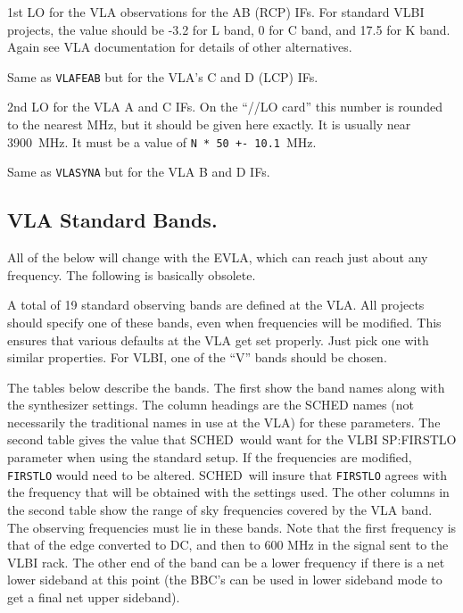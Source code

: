 \documentclass{report}
\newcommand{\schedb}{{\sc SCHED~}}
\begin{document}
\begin{list}{}{\parsep 0em  \itemsep 0em }
\item {} 1st LO for the VLA observations
for the AB (RCP) IFs. For standard VLBI projects, the value should be
-3.2 for L band, 0 for C band, and 17.5 for K band. Again see VLA
documentation for details of other alternatives.

\item {} Same as {\tt VLAFEAB} but for
the VLA's C and D (LCP) IFs.

\item {} 2nd LO for the VLA A and C IFs.
On the ``//LO card'' this number is rounded to the nearest MHz, but it
should be given here exactly. It is usually near 3900~MHz. It must be
a value of {\tt N * 50 +- 10.1}~MHz.

\item {} Same as {\tt VLASYNA} but for
the VLA B and D IFs.

\end{list}

\subsection{\label{SSEC:VLASTDBD}VLA Standard Bands.}

All of the below will change with the EVLA, which can reach just about
any frequency.  The following is basically obsolete.

A total of 19 standard observing bands are defined at the VLA.  All
projects should specify one of these bands, even when frequencies will
be modified.  This ensures that various defaults at the VLA get set
properly.  Just pick one with similar properties.  For VLBI, one of the
``V'' bands should be chosen.

The tables below describe the bands.
The first show the band names along with the synthesizer settings.
The column headings are the SCHED names (not necessarily the traditional
names in use at the VLA) for these parameters.  The second table gives
the value that \schedb would want for the VLBI 
{SP:FIRSTLO} parameter when using the standard setup.  If the
frequencies are modified, {\tt FIRSTLO} would need to be altered.
\schedb will insure that {\tt FIRSTLO} agrees with the frequency
that will be obtained with the settings used.  The other columns
in the second table show the range of sky frequencies covered by
the VLA band.  The observing frequencies must lie in these bands.  Note
that the first frequency is that of the edge converted to DC, and then
to 600 MHz in the signal sent to the VLBI rack.  The other end of the
band can be a lower frequency if there is a net lower sideband at this
point (the BBC's can be used in lower sideband mode to get a final
net upper sideband).
\end{document}
